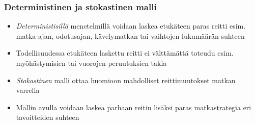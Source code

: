 \documentclass{beamer}
\begin{document}
\begin{frame}
  \frametitle{Deterministinen ja stokastinen malli} 
  \begin{itemize}
   \item 
    \emph{Deterministisillä} menetelmillä voidaan laskea etukäteen paras reitti esim. matka-ajan, odotusajan, kävelymatkan tai vaihtojen lukumäärän suhteen 
    \item
    Todellisuudessa etukäteen laskettu reitti ei välttämättä toteudu esim. myöhästymisien tai vuorojen peruutuksien takia
    \item
    \emph{Stokastinen} malli ottaa huomioon mahdolliset reittimuutokset matkan varrella
    \item
    Mallin avulla voidaan laskea parhaan reitin lisäksi paras matkastrategia eri tavoitteiden suhteen
   \end{itemize}
     \begin{center}
      \end{center}
\end{frame} 
\end{document}
